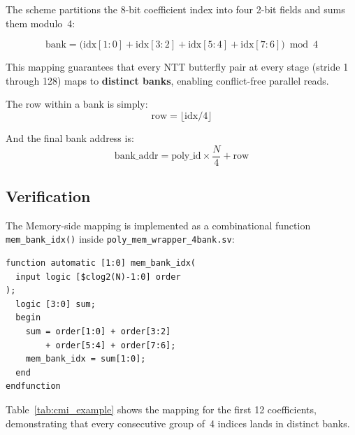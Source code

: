 \documentclass[11pt,letterpaper]{article}
\begin{document}
The scheme partitions the 8-bit coefficient index into four 2-bit fields
and sums them modulo~4:

\begin{equation}
  \text{bank} = \bigl(\text{idx}[1{:}0] + \text{idx}[3{:}2]
                     + \text{idx}[5{:}4] + \text{idx}[7{:}6]\bigr) \bmod 4
  \label{eq:cmi}
\end{equation}

This mapping guarantees that every NTT butterfly pair at every stage
(stride 1 through 128) maps to \textbf{distinct banks}, enabling
conflict-free parallel reads.

The row within a bank is simply:
\begin{equation}
  \text{row} = \lfloor \text{idx} / 4 \rfloor
\end{equation}

And the final bank address is:
\begin{equation}
  \text{bank\_addr} = \text{poly\_id} \times \frac{N}{4} + \text{row}
\end{equation}

\subsection{Verification}

The Memory-side mapping is implemented as a combinational function
\texttt{mem\_bank\_idx()} inside \texttt{poly\_mem\_wrapper\_4bank.sv}:

\begin{lstlisting}[style=sv, caption={Memory bank mapping function.}]
function automatic [1:0] mem_bank_idx(
  input logic [$clog2(N)-1:0] order
);
  logic [3:0] sum;
  begin
    sum = order[1:0] + order[3:2]
        + order[5:4] + order[7:6];
    mem_bank_idx = sum[1:0];
  end
endfunction
\end{lstlisting}

Table~\ref{tab:cmi_example} shows the mapping for the first 12
coefficients, demonstrating that every consecutive group of~4 indices
lands in distinct banks.
\end{document}
